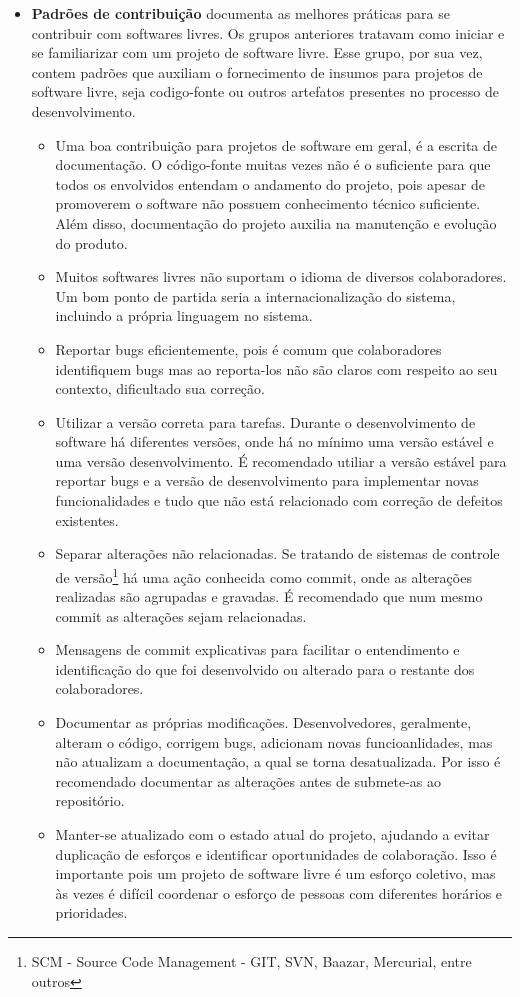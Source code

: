 \begin{itemize}
\item \textbf{Padrões de contribuição} documenta as melhores práticas para se contribuir com softwares livres. Os grupos anteriores tratavam como iniciar e se familiarizar com um projeto de software livre. Esse grupo, por sua vez, contem padrões que auxiliam o fornecimento de insumos para projetos de software livre, seja codigo-fonte ou outros artefatos presentes no processo de desenvolvimento.
	\begin{itemize}
	\item Uma boa contribuição para projetos de software em geral, é a escrita de documentação. O código-fonte muitas vezes não é o suficiente para que todos os envolvidos entendam o andamento do projeto, pois apesar de promoverem o software não possuem conhecimento técnico suficiente. Além disso, documentação do projeto auxilia na manutenção e evolução do produto.
	\item Muitos softwares livres não suportam o idioma de diversos colaboradores. Um bom ponto de partida seria a internacionalização do sistema, incluindo a própria linguagem no sistema.
	\item Reportar bugs eficientemente, pois é comum que colaboradores identifiquem bugs mas ao reporta-los não são claros com respeito ao seu contexto, dificultado sua correção.
	\item Utilizar a versão correta para tarefas. Durante o desenvolvimento de software há diferentes versões, onde há no mínimo uma versão estável e uma versão desenvolvimento. É recomendado utiliar a versão estável para reportar bugs e a versão de desenvolvimento para implementar novas funcionalidades e tudo que não está relacionado com correção de defeitos existentes.
	\item Separar alterações não relacionadas. Se tratando de sistemas de controle de versão\footnote{SCM - Source Code Management - GIT, SVN, Baazar, Mercurial, entre outros} há uma ação conhecida como commit, onde as alterações realizadas são agrupadas e gravadas. É recomendado que num mesmo commit as alterações sejam relacionadas.
	\item Mensagens de commit explicativas para facilitar o entendimento e identificação do que foi desenvolvido ou alterado para o restante dos colaboradores.
	\item Documentar as próprias modificações. Desenvolvedores, geralmente, alteram o código, corrigem bugs, adicionam novas funcioanlidades, mas não atualizam a documentação, a qual se torna desatualizada. Por isso é recomendado documentar as alterações antes de submete-as ao repositório.
	\item Manter-se atualizado com o estado atual do projeto, ajudando a evitar duplicação de esforços e identificar oportunidades de colaboração. Isso é importante pois um projeto de software livre é um esforço coletivo, mas às vezes é difícil coordenar o esforço de pessoas com diferentes horários e prioridades.
	\end{itemize}
\end{itemize}














